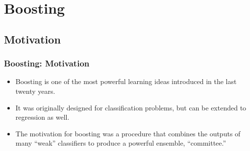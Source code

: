 \documentclass[
  shownotes,
  xcolor={svgnames},
  hyperref={colorlinks,citecolor=DarkBlue,linkcolor=DarkRed,urlcolor=DarkBlue}
  , aspectratio=169]{beamer}
\begin{document}
\section{Boosting}
\subsection{Motivation}
\begin{frame}[fragile]
\frametitle{Boosting: Motivation}

\begin{itemize}

\item Boosting is one of the most powerful learning ideas introduced in the last twenty years. 
\medskip
\item It was originally designed for classification problems, but  can  be extended to regression as well. 
\medskip
\item The motivation for boosting was a procedure that combines the outputs of many “weak” classifiers to produce a powerful ensemble, “committee.” 

 \end{itemize}




\end{frame}
\end{document}
